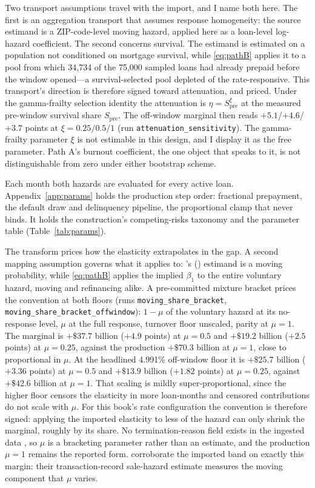 \documentclass[12pt]{article}
\newcommand{\citepos}[1]{\citeauthor{#1}'s (\citeyear{#1})}
\begin{document}
Two transport assumptions travel with the import, and I name both here. The first is an aggregation transport that assumes response homogeneity: the source estimand is a ZIP-code-level moving hazard, applied here as a loan-level log-hazard coefficient. The second concerns survival. The estimand is estimated on a population not conditioned on mortgage survival, while \eqref{eq:pathB} applies it to a pool from which 34,734 of the 75,000 sampled loans had already prepaid before the window opened---a survival-selected pool depleted of the rate-responsive. This transport's direction is therefore signed toward attenuation, and priced. Under the gamma-frailty selection identity the attenuation is $\eta = S_{\mathrm{pre}}^{\xi}$ at the measured pre-window survival share $S_{\mathrm{pre}}$. The off-window marginal then reads $+5.1$/$+4.6$/$+3.7$ points at $\xi = 0.25/0.5/1$ (run \texttt{attenuation\_sensitivity}). The gamma-frailty parameter $\xi$ is not estimable in this design, and I display it as the free parameter. Path A's burnout coefficient, the one object that speaks to it, is not distinguishable from zero under either bootstrap scheme.

Each month both hazards are evaluated for every active loan. Appendix~\ref{app:params} holds the production step order: fractional prepayment, the default draw and delinquency pipeline, the proportional clamp that never binds. It holds the construction's competing-risks taxonomy and the parameter table (Table~\ref{tab:params}).

The transform prices how the elasticity extrapolates in the gap. A second mapping assumption governs what it applies to: \citepos{liebersohn2024} estimand is a moving probability, while \eqref{eq:pathB} applies the implied $\beta_1$ to the entire voluntary hazard, moving and refinancing alike. A pre-committed mixture bracket prices the convention at both floors (runs \texttt{moving\_share\_bracket}, \texttt{moving\_share\_bracket\_offwindow}): $1-\mu$ of the voluntary hazard at its no-response level, $\mu$ at the full response, turnover floor unscaled, parity at $\mu = 1$. The marginal is $+\$37.7$ billion ($+4.9$ points) at $\mu = 0.5$ and $+\$19.2$ billion ($+2.5$ points) at $\mu = 0.25$, against the production $+\$70.3$ billion at $\mu = 1$, close to proportional in $\mu$. At the headlined 4.991\% off-window floor it is $+\$25.7$ billion ($+3.36$ points) at $\mu = 0.5$ and $+\$13.9$ billion ($+1.82$ points) at $\mu = 0.25$, against $+\$42.6$ billion at $\mu = 1$. That scaling is mildly super-proportional, since the higher floor censors the elasticity in more loan-months and censored contributions do not scale with $\mu$. For this book's rate configuration the convention is therefore signed: applying the imported elasticity to less of the hazard can only shrink the marginal, roughly by its share. No termination-reason field exists in the ingested data \citep[cf.][on the refinancing-versus-moving mix]{amromin2020}, so $\mu$ is a bracketing parameter rather than an estimate, and the production $\mu = 1$ remains the reported form. \citet{graybill2026} corroborate the imported band on exactly this margin: their transaction-record sale-hazard estimate measures the moving component that $\mu$ varies.
\end{document}
